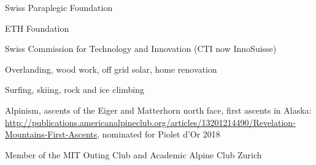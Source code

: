 \begin{cventries}

\cventry
    { } %
    { } %
    {} %
    {} %
    {
\begin{cvitems} %
        \item {Swiss Paraplegic Foundation}
        \item {ETH Foundation}
        \item{Swiss Commission for Technology and Innovation (CTI now InnoSuisse)}
\end{cvitems}
}
\end{cventries}

\begin{cventries}

  \cventry
    {} %
    {} %
    {} %
    {} %
    {
      \begin{cvitems} %
        \item{Overlanding, wood work, off grid solar, home renovation}
        \item{Surfing, skiing, rock and ice climbing}
        \item {Alpinism, ascents of the Eiger and Matterhorn north face, first ascents in Alaska: \url{http://publications.americanalpineclub.org/articles/13201214490/Revelation-Mountains-First-Ascents}, nominated for Piolet d'Or 2018}
        \item {Member of the MIT Outing Club and Academic Alpine Club Zurich}
      \end{cvitems}
    }


\end{cventries}
